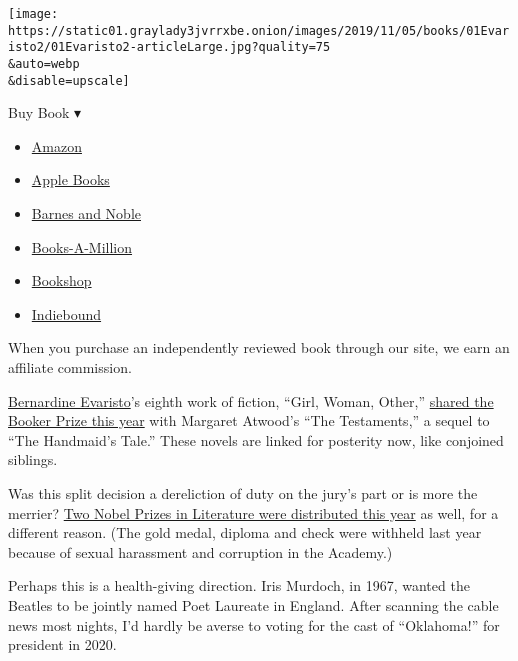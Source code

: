 \texttt{[image: https://static01.graylady3jvrrxbe.onion/images/2019/11/05/books/01Evaristo2/01Evaristo2-articleLarge.jpg?quality=75\\\&auto=webp\\\&disable=upscale]}

Buy Book ▾

\begin{itemize}
\tightlist
\item
  \href{https://www.amazon.com/gp/search?index=books\&tag=NYTBSREV-20\&field-keywords=Girl\%2C+Woman\%2C+Other+Bernardine+Evaristo}{Amazon}
\item
  \href{https://du-gae-books-dot-nyt-du-prd.appspot.com/buy?title=Girl\%2C+Woman\%2C+Other\&author=Bernardine+Evaristo}{Apple
  Books}
\item
  \href{https://www.anrdoezrs.net/click-7990613-11819508?url=https\%3A\%2F\%2Fwww.barnesandnoble.com\%2Fw\%2F\%3Fean\%3D9780802156983}{Barnes
  and Noble}
\item
  \href{https://www.anrdoezrs.net/click-7990613-35140?url=https\%3A\%2F\%2Fwww.booksamillion.com\%2Fp\%2FGirl\%252C\%2BWoman\%252C\%2BOther\%2FBernardine\%2BEvaristo\%2F9780802156983}{Books-A-Million}
\item
  \href{https://bookshop.org/a/3546/9780802156983}{Bookshop}
\item
  \href{https://www.indiebound.org/book/9780802156983?aff=NYT}{Indiebound}
\end{itemize}

When you purchase an independently reviewed book through our site, we
earn an affiliate commission.

\href{https://www.nytimes3xbfgragh.onion/2019/11/01/books/bernardine-evaristo-girl-woman-other-booker-prize.html}{Bernardine
Evaristo}'s eighth work of fiction, ``Girl, Woman, Other,''
\href{https://www.nytimes3xbfgragh.onion/2019/10/14/books/booker-prize-winner-atwood-evaristo.html}{shared
the Booker Prize this year} with Margaret Atwood's ``The Testaments,'' a
sequel to ``The Handmaid's Tale.'' These novels are linked for posterity
now, like conjoined siblings.

Was this split decision a dereliction of duty on the jury's part or is
more the merrier?
\href{https://www.nytimes3xbfgragh.onion/2019/10/10/books/nobel-literature.html}{Two
Nobel Prizes in Literature were distributed this year} as well, for a
different reason. (The gold medal, diploma and check were withheld last
year because of sexual harassment and corruption in the Academy.)

Perhaps this is a health-giving direction. Iris Murdoch, in 1967, wanted
the Beatles to be jointly named Poet Laureate in England. After scanning
the cable news most nights, I'd hardly be averse to voting for the cast
of ``Oklahoma!'' for president in 2020.

